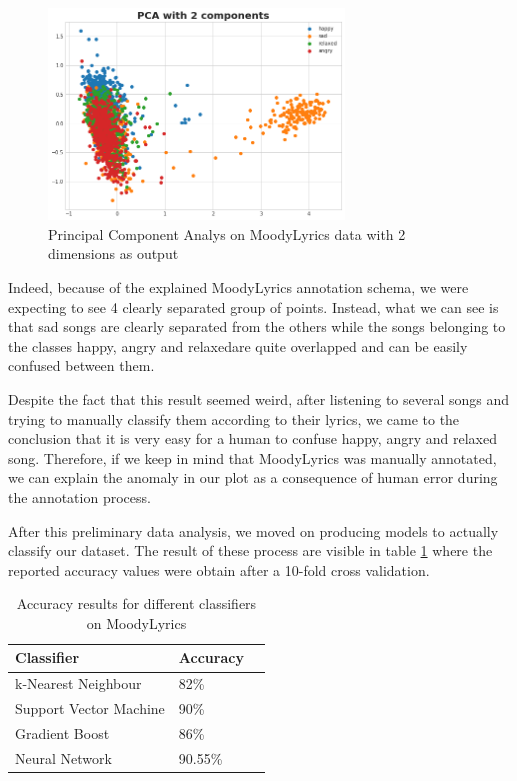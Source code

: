 \begin{figure}[H]
  \centering
  \includegraphics[width=0.7\textwidth]{./chapters/chapter4/images/ml-pca.png}
  \caption{Principal Component Analys on MoodyLyrics data with 2 dimensions as output}
  \label{fig:ml-pca}
\end{figure}

Indeed, because of the explained MoodyLyrics annotation schema, we were expecting to see 4 clearly separated group of points. Instead, what we can see is that sad songs are clearly separated from the others while the songs belonging to the classes happy, angry and relaxedare quite overlapped and can be easily confused between them.

Despite the fact that this result seemed weird, after listening to several songs and trying to
manually classify them according to their lyrics, we came to the conclusion that it is very
easy for a human to confuse happy, angry and relaxed song. Therefore, if we keep in mind that
MoodyLyrics was manually annotated, we can explain the anomaly in our plot as a consequence of human error during the annotation process.


After this preliminary data analysis, we moved on producing models to actually classify our dataset.
The result of these process are visible in table \ref{table:ml-simple-results} where the reported accuracy values were obtain after a 10-fold cross validation.

\begin{table}[H]
\centering
\begin{tabular}{@{}lll@{}}
\toprule
\textbf{Classifier} & \textbf{Accuracy}   \\ \midrule
k-Nearest Neighbour & 82\%  \\
Support Vector Machine & 90\%  \\
Gradient Boost & 86\%  \\
Neural Network & 90.55\%  \\
\end{tabular}
\caption{Accuracy results for different classifiers on MoodyLyrics}
\label{table:ml-simple-results}
\end{table}

